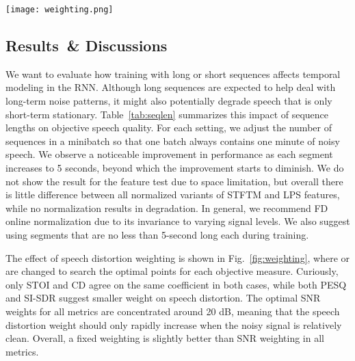 \documentclass{article}
\begin{document}
\begin{figure*}[h]
  \texttt{[image: weighting.png]}
  \caption{Effect of fixed weighting and SNR weighting on objective speech quality and intelligibility measures. Black dashed vertical lines indicate the optimal coefficient for each metric. Note that the optimal points coincide for STOI and CD at  and  dB.}
  \label{fig:weighting}
\end{figure*}
\vspace{-2mm}
\subsection{Results~\& Discussions}
\vspace{-1mm}
We want to evaluate how training with long or short sequences affects temporal modeling in the RNN. Although long sequences are expected to help deal with long-term noise patterns, it might also potentially degrade speech that is only short-term stationary. Table~\ref{tab:seqlen} summarizes this impact of sequence lengths on objective speech quality. For each setting, we adjust the number of sequences in a minibatch so that one batch always contains one minute of noisy speech. We observe a noticeable improvement in performance as each segment increases to 5 seconds, beyond which the improvement starts to diminish. We do not show the result for the feature test due to space limitation, but overall there is little difference between all normalized variants of \ac{STFTM} and \ac{LPS} features, while no normalization results in degradation. In general, we recommend \ac{FD} online normalization due to its invariance to varying signal levels. We also suggest using segments that are no less than 5-second long each during training.





The effect of speech distortion weighting is shown in Fig.~\ref{fig:weighting}, where  or  are changed to search the optimal points for each objective measure. Curiously, only \ac{STOI} and \ac{CD} agree on the same coefficient in both cases, while both \ac{PESQ} and \ac{SI-SDR} suggest smaller weight on speech distortion. The optimal SNR weights for all metrics are concentrated around 20 dB, meaning that the speech distortion weight should only rapidly increase when the noisy signal is relatively clean. Overall, a fixed weighting is slightly better than SNR weighting in all metrics.
\end{document}
